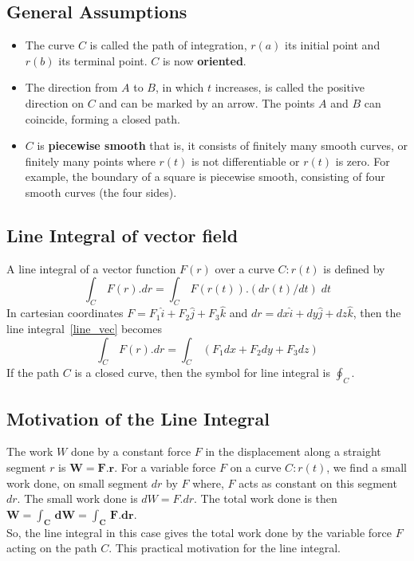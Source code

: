 \documentclass[aima331_lecturenotes_ku.tex]{subfiles}
\begin{document}
\subsection{General Assumptions}
\begin{itemize}
\item The curve $C$ is called the path of integration, $r(a)$ its initial point and $r(b)$ its terminal point. $C$ is now \textbf{oriented}.

\item The direction from $A$ to $B$, in which $t$ increases, is called the positive direction on $C$ and can be marked by an arrow. The points $A$ and $B$ can coincide, forming a closed path.

\item $C$ is \textbf{piecewise smooth} that is, it consists of finitely many smooth curves, or finitely many points where $r(t)$ is not differentiable or $r(t)$ is zero.  For example, the boundary of a square is piecewise smooth, consisting of four smooth curves (the four sides).
  \end{itemize}

\subsection{Line Integral of vector field}
A line integral of a vector function $F(r)$ over a curve $C:r(t)$ is defined by
\begin{equation}
  \label{line_vec}
  \int_C \, F(r).dr = \int_C \, F(r(t)).(dr(t)/dt)\;dt
\end{equation}
In cartesian coordinates $F=F_1\hat{i} + F_2\hat{j} + F_3\hat{k}$ and $dr=dx\hat{i} + dy\hat{j} + dz\hat{k}$, then the line integral~\ref{line_vec} becomes
\begin{equation}
  \label{line_cartesian}
\int_C \, F(r).dr = \int_C \, (F_1dx+F_2dy+F_3dz)
\end{equation}
If the path $C$ is a closed curve, then the symbol for line integral is $\displaystyle \oint_C$.

\subsection{Motivation of the Line Integral}
The work $W$ done by a constant force $F$ in the displacement along a straight segment $r$ is $\mathbf{W=F.r}$. For a variable force $F$ on a curve $C:r(t)$, we find a small work done, on small segment $dr$ by $F$ where, $F$ acts as constant on this segment $dr$. The small work done is $dW=F.dr$. The total work done is then $\mathbf{W=\int_C\, dW= \int_C \, F.dr}$. \\
So, the line integral in this case gives the total work done by the variable force $F$ acting on the path $C$. This practical motivation for the line integral.
\end{document}
